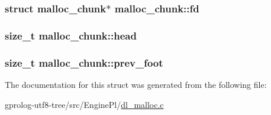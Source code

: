 \subsubsection[{\texorpdfstring{fd}{fd}}]{\setlength{\rightskip}{0pt plus 5cm}struct {\bf malloc\+\_\+chunk}$\ast$ malloc\+\_\+chunk\+::fd}\hypertarget{structmalloc__chunk_a9972ab720231dd0c0d3c202176ce13c5}{}\label{structmalloc__chunk_a9972ab720231dd0c0d3c202176ce13c5}
\subsubsection[{\texorpdfstring{head}{head}}]{\setlength{\rightskip}{0pt plus 5cm}size\+\_\+t malloc\+\_\+chunk\+::head}\hypertarget{structmalloc__chunk_a7383bb525d34ca811283c927086205bc}{}\label{structmalloc__chunk_a7383bb525d34ca811283c927086205bc}
\subsubsection[{\texorpdfstring{prev\+\_\+foot}{prev_foot}}]{\setlength{\rightskip}{0pt plus 5cm}size\+\_\+t malloc\+\_\+chunk\+::prev\+\_\+foot}\hypertarget{structmalloc__chunk_a2cbb92874183d7a4b42e150b7d7ec1f9}{}\label{structmalloc__chunk_a2cbb92874183d7a4b42e150b7d7ec1f9}


The documentation for this struct was generated from the following file\+:\begin{DoxyCompactItemize}
\item 
gprolog-\/utf8-\/tree/src/\+Engine\+Pl/\hyperlink{dl__malloc_8c}{dl\+\_\+malloc.\+c}\end{DoxyCompactItemize}
